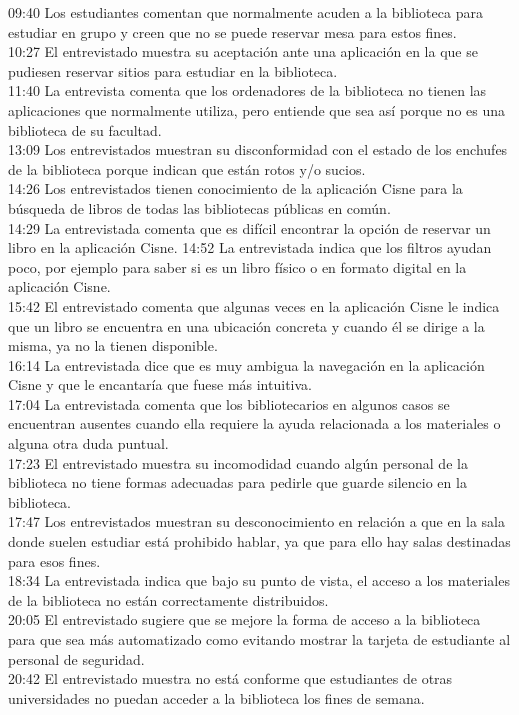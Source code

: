\documentclass[12pt]{article}
\begin{document}
09:40 Los estudiantes comentan que normalmente acuden a la biblioteca para estudiar en grupo y creen que no se puede reservar mesa para estos fines.\\
10:27 El entrevistado muestra su aceptación ante una aplicación en la que se pudiesen reservar sitios para estudiar en la biblioteca.\\
11:40 La entrevista comenta que los ordenadores de la biblioteca no tienen las aplicaciones que normalmente utiliza, pero entiende que sea así porque no es una biblioteca de su facultad.\\
13:09 Los entrevistados muestran su disconformidad con el estado de los enchufes de la biblioteca porque indican que están rotos y/o sucios.\\
14:26 Los entrevistados tienen conocimiento de la aplicación Cisne para la búsqueda de libros de todas las bibliotecas públicas en común. \\
14:29 La entrevistada comenta que es difícil encontrar la opción de reservar un libro en la aplicación Cisne.
14:52 La entrevistada indica que los filtros ayudan poco, por ejemplo para saber si es un libro físico o en formato digital en la aplicación Cisne.\\
15:42 El entrevistado comenta que algunas veces en la aplicación Cisne le indica que un libro se encuentra en una ubicación concreta y cuando él se dirige a la misma, ya no la tienen disponible.\\
16:14 La entrevistada dice que es muy ambigua la navegación en la aplicación Cisne y que le encantaría que fuese más intuitiva. \\
17:04 La entrevistada comenta que los bibliotecarios en algunos casos se encuentran ausentes cuando ella requiere la ayuda relacionada a los materiales o alguna otra duda puntual.\\
17:23 El entrevistado muestra su incomodidad cuando algún personal de la biblioteca no tiene formas adecuadas para pedirle que guarde silencio en la biblioteca.\\
17:47 Los entrevistados muestran su desconocimiento en relación a que en la sala donde suelen estudiar está prohibido hablar, ya que para ello hay salas destinadas para esos fines. \\
18:34 La entrevistada indica que bajo su punto de vista, el acceso a los materiales de la biblioteca no están correctamente distribuidos.\\
20:05 El entrevistado sugiere que se mejore la forma de acceso a la biblioteca para que sea más automatizado como evitando mostrar la tarjeta de estudiante al personal de seguridad.\\
20:42 El entrevistado muestra no está conforme que estudiantes de otras universidades no puedan acceder a la biblioteca los fines de semana.\\
\end{document}

